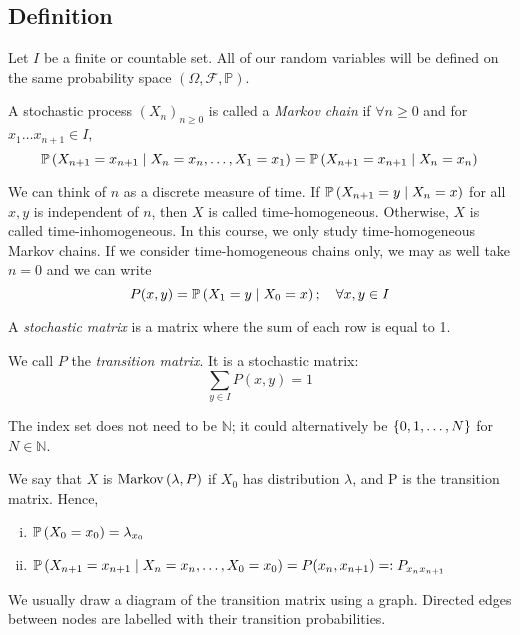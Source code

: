 \subsection{Definition}
Let \( I \) be a finite or countable set.
All of our random variables will be defined on the same probability space \( (\Omega, \mathcal F, \mathbb P) \).
\begin{definition}
	A stochastic process \( (X_n)_{n \geq 0} \) is called a \textit{Markov chain} if \( \forall n \geq 0 \) and for \( x_1 \dots x_{n+1} \in I \),
	\[
		\mathbb{P}\left({X_{n+1} = x_{n+1} \mid X_n = x_n, \dots,X_1 = x_1}\right) = \mathbb{P}\left({X_{n+1} = x_{n+1} \mid X_n = x_n}\right)
	\]
\end{definition}
\noindent We can think of \( n \) as a discrete measure of time.
If \( \mathbb{P}\left({X_{n+1} = y \mid X_n = x}\right) \) for all \( x, y \) is independent of \( n \), then \( X \) is called time-homogeneous.
Otherwise, \( X \) is called time-inhomogeneous.
In this course, we only study time-homogeneous Markov chains.
If we consider time-homogeneous chains only, we may as well take \( n = 0 \) and we can write
\[
	P(x,y) = \mathbb{P}\left({X_1 = y \mid X_0 = x}\right);\quad \forall x,y \in I
\]
\begin{definition}
	A \textit{stochastic matrix} is a matrix where the sum of each row is equal to 1.
\end{definition}
\noindent We call \( P \) the \textit{transition matrix}.
It is a stochastic matrix:
\[
	\sum_{y \in I} P(x,y) = 1
\]
\begin{remark}
	The index set does not need to be \( \mathbb N \); it could alternatively be \( \qty{0,1,\dots,N} \) for \( N \in \mathbb N \).
\end{remark}
We say that \( X \) is \(\operatorname{Markov}\left({\lambda, P}\right)\) if \( X_0 \) has distribution \(\lambda\), and P is the transition matrix.
Hence,
\begin{enumerate}[(i)]
	\item \( \mathbb{P}\left({X_0 = x_0}\right) = \lambda_{x_0} \)
	\item \( \mathbb{P}\left({X_{n+1} = x_{n+1} \mid X_n = x_n, \dots, X_0 = x_0}\right) = P(x_n, x_{n+1}) =: P_{x_n x_{n+1}} \)
\end{enumerate}
We usually draw a diagram of the transition matrix using a graph.
Directed edges between nodes are labelled with their transition probabilities.

